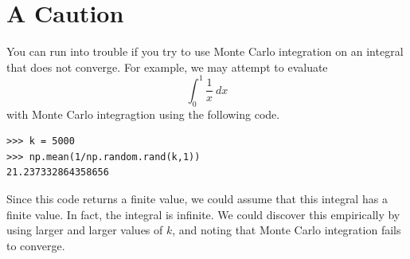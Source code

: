 \section*{A Caution} %

You can run into trouble if you try to use Monte Carlo integration on an integral that does not converge.
For example, we may attempt to evaluate
\[
\int_0^1 \frac{1}{x}\:dx
\]
with Monte Carlo integragtion using the following code.
\begin{lstlisting}
>>> k = 5000
>>> np.mean(1/np.random.rand(k,1))
21.237332864358656
\end{lstlisting}

Since this code returns a finite value, we could assume that this integral has a finite value.
In fact, the integral is infinite.
We could discover this empirically by using larger and larger values of $k$, and noting that Monte Carlo integration fails to converge.

